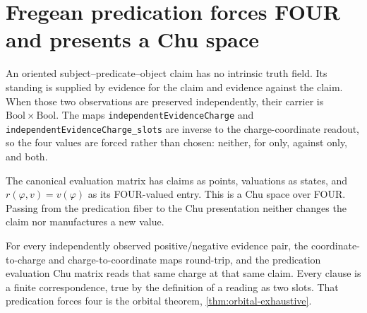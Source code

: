 \section{Fregean predication forces FOUR and presents a Chu space}

\begin{proposition}\label{thm:predication-independent-evidence-four}\leanok{}
An oriented subject--predicate--object claim has no intrinsic truth field.  Its
standing is supplied by evidence for the claim and evidence against the claim.
When those two observations are preserved independently, their carrier is
$\mathrm{Bool}\times\mathrm{Bool}$.  The maps
\texttt{independentEvidenceCharge} and
\texttt{independentEvidenceCharge\_slots} are inverse to the charge-coordinate
readout, so the four values are forced rather than chosen: neither, for only,
against only, and both.
\end{proposition}

\begin{proposition}\label{thm:predication-chu}\leanok{}
The canonical evaluation matrix has claims as points, valuations as states, and
$r(\varphi,v)=v(\varphi)$ as its FOUR-valued entry.  This is a Chu space over
FOUR.  Passing from the predication fiber to the Chu presentation neither
changes the claim nor manufactures a new value.
\end{proposition}

\begin{proposition}\label{thm:fregean-predication-four-chu}\leanok{}
For every independently observed positive/negative evidence pair, the
coordinate-to-charge and charge-to-coordinate maps round-trip, and the
predication evaluation Chu matrix reads that same charge at that same claim.
Every clause is a finite correspondence, true by the definition of a reading as two
slots. That predication forces four is the orbital theorem, \cref{thm:orbital-exhaustive}.
\end{proposition}
